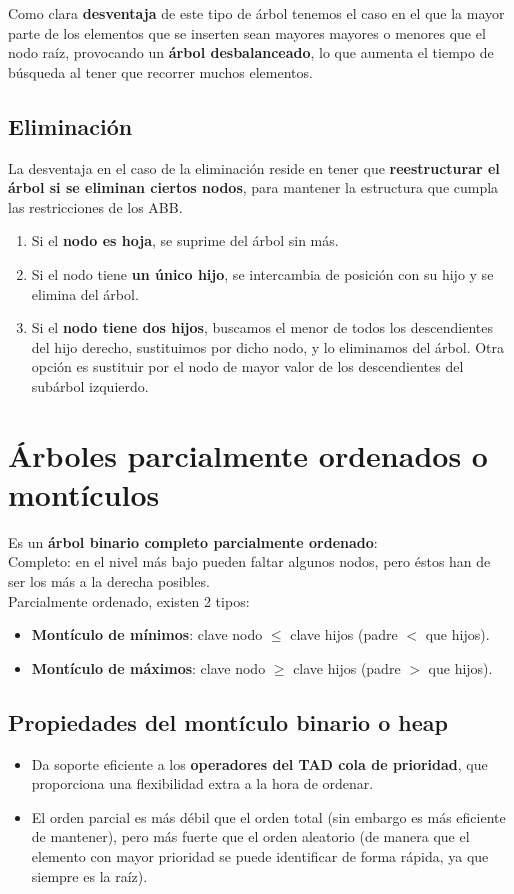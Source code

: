 \documentclass{article}
\begin{document}
Como clara \textbf{desventaja} de este tipo de árbol tenemos el caso en el que la mayor parte de los elementos que se inserten sean mayores mayores o menores que el nodo raíz, provocando un \textbf{árbol desbalanceado}, lo que aumenta el tiempo de búsqueda al tener que recorrer muchos elementos.

\subsection{Eliminación}
La desventaja en el caso de la eliminación reside en tener que \textbf{reestructurar el árbol si se eliminan ciertos nodos}, para mantener la estructura que cumpla las restricciones de los ABB.
\begin{enumerate}
    \item Si el \textbf{nodo es hoja}, se suprime del árbol sin más.
    \item Si el nodo tiene \textbf{un único hijo}, se intercambia de posición con su hijo y se elimina del árbol.
    
    \item Si el \textbf{nodo tiene dos hijos}, buscamos el menor de todos los descendientes del hijo derecho, sustituimos por dicho nodo, y lo eliminamos del árbol. Otra opción es sustituir por el nodo de mayor valor de los descendientes del subárbol izquierdo.
\end{enumerate}

\section{Árboles parcialmente ordenados o montículos}
Es un \textbf{árbol binario completo parcialmente ordenado}: \\
Completo: en el nivel más bajo pueden faltar algunos nodos, pero éstos han de ser los más a la derecha posibles. \\
Parcialmente ordenado, existen 2 tipos: \\
\begin{itemize}
    \item \textbf{Montículo de mínimos}: clave nodo $\leq$ clave hijos (padre $<$ que hijos).

    \item \textbf{Montículo de máximos}: clave nodo $\geq$ clave hijos (padre $>$ que hijos).
\end{itemize}

\subsection{Propiedades del montículo binario o heap}
\begin{itemize}
    \item Da soporte eficiente a los \textbf{operadores del TAD cola de prioridad}, que proporciona una flexibilidad extra a la hora de ordenar.

    \item El orden parcial es más débil que el orden total (sin embargo es más eficiente de mantener), pero más fuerte que el orden aleatorio (de manera que el elemento con mayor prioridad se puede identificar de forma rápida, ya que siempre es la raíz).
\end{itemize}
\end{document}
